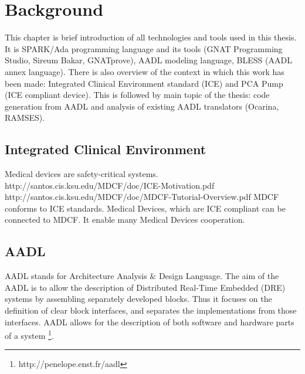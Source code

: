 
\cleardoublepage


\chapter{Background}
\label{background}

This chapter is brief introduction of all technologies and tools used in this thesis. It is SPARK/Ada programming language and its tools (GNAT Programming Studio, Sireum Bakar, GNATprove), AADL modeling language, BLESS (AADL annex language). There is also overview of the context in which this work has been made: Integrated Clinical Environment standard (ICE) and PCA Pump (ICE compliant device). This is followed by main topic of the thesis: code generation from AADL and analysis of existing AADL translators (Ocarina, RAMSES).



\section{Integrated Clinical Environment}
\label{background:ice}
Medical devices are safety-critical systems.
http://santos.cis.ksu.edu/MDCF/doc/ICE-Motivation.pdf
http://santos.cis.ksu.edu/MDCF/doc/MDCF-Tutorial-Overview.pdf
MDCF conforms to ICE standards. Medical Devices, which are ICE compliant can be connected to MDCF. It enable many Medical Devices cooperation.



\section{AADL}
\label{background:aadl}

AADL stands for Architecture Analysis \& Design Language. The aim of the AADL is to allow the description of Distributed Real-Time Embedded (DRE) systems by assembling separately developed blocks. Thus it focuses on the definition of clear block interfaces, and separates the implementations from those interfaces. AADL allows for the description of both software and hardware parts of a system \footnote{http://penelope.enst.fr/aadl}.

